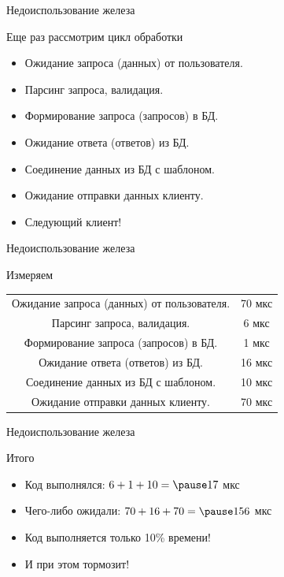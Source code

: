 \documentclass[aspectratio=169]{beamer}
\begin{document}
\begin{frame}{Недоиспользование железа}
    \begin{block}{Еще раз рассмотрим цикл обработки}
        \begin{itemize}
            \pause\item Ожидание запроса (данных) от пользователя.
            \pause\item Парсинг запроса, валидация.
            \pause\item Формирование запроса (запросов) в БД.
            \pause\item Ожидание ответа (ответов) из БД.
            \pause\item Соединение данных из БД с шаблоном.
            \pause\item Ожидание отправки данных клиенту.
        \end{itemize}
        
        \begin{itemize}
            \pause\item Следующий клиент!
        \end{itemize}
    \end{block}
\end{frame}

\begin{frame}{Недоиспользование железа}
    \begin{block}{Измеряем}
        \begin{tabular}{ c c }
            \pause Ожидание запроса (данных) от пользователя. & 70 мкс \\
            \pause Парсинг запроса, валидация.  & 6 мкс \\
            \pause Формирование запроса (запросов) в БД. & 1 мкс \\
            \pause Ожидание ответа (ответов) из БД. & 16 мкс \\
            \pause Соединение данных из БД с шаблоном. & 10 мкс\\
            \pause Ожидание отправки данных клиенту. & 70 мкс \\
        \end{tabular}
    \end{block}
\end{frame}

\begin{frame}{Недоиспользование железа}
    \begin{block}{Итого}
        \begin{itemize}
            \item Код выполнялся: $6 + 1 + 10 = \pause17$ мкс
            \pause\item Чего-либо ожидали: $70 + 16 + 70 = \pause156$ мкс
            \pause\item {\large Код выполняется только 10\% времени!}
            \pause\item И при этом тормозит!
        \end{itemize}
    \end{block}
\end{frame}
\end{document}
